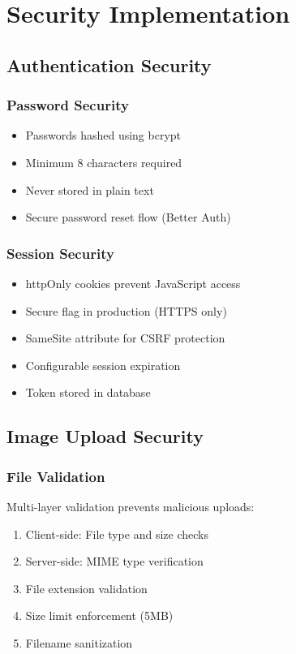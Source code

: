 \documentclass[12pt,a4paper]{report}
\begin{document}
\chapter{Security Implementation}

\section{Authentication Security}

\subsection{Password Security}

\begin{itemize}
    \item Passwords hashed using bcrypt
    \item Minimum 8 characters required
    \item Never stored in plain text
    \item Secure password reset flow (Better Auth)
\end{itemize}

\subsection{Session Security}

\begin{itemize}
    \item httpOnly cookies prevent JavaScript access
    \item Secure flag in production (HTTPS only)
    \item SameSite attribute for CSRF protection
    \item Configurable session expiration
    \item Token stored in database
\end{itemize}

\section{Image Upload Security}

\subsection{File Validation}

Multi-layer validation prevents malicious uploads:

\begin{enumerate}
    \item Client-side: File type and size checks
    \item Server-side: MIME type verification
    \item File extension validation
    \item Size limit enforcement (5MB)
    \item Filename sanitization
\end{enumerate}
\end{document}
